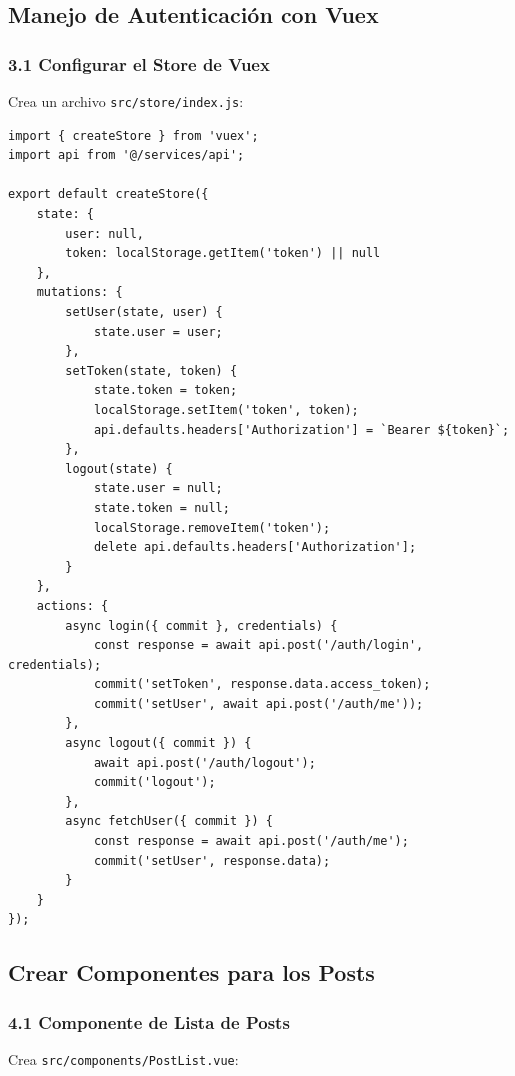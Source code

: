 \documentclass[11pt]{article}
\begin{document}
\subsection{Manejo de Autenticación con Vuex}
\label{sec:orged00ea2}

\subsubsection{3.1 Configurar el Store de Vuex}
\label{sec:org1351661}
Crea un archivo \texttt{src/store/index.js}:

\begin{verbatim}
import { createStore } from 'vuex';
import api from '@/services/api';

export default createStore({
    state: {
        user: null,
        token: localStorage.getItem('token') || null
    },
    mutations: {
        setUser(state, user) {
            state.user = user;
        },
        setToken(state, token) {
            state.token = token;
            localStorage.setItem('token', token);
            api.defaults.headers['Authorization'] = `Bearer ${token}`;
        },
        logout(state) {
            state.user = null;
            state.token = null;
            localStorage.removeItem('token');
            delete api.defaults.headers['Authorization'];
        }
    },
    actions: {
        async login({ commit }, credentials) {
            const response = await api.post('/auth/login', credentials);
            commit('setToken', response.data.access_token);
            commit('setUser', await api.post('/auth/me'));
        },
        async logout({ commit }) {
            await api.post('/auth/logout');
            commit('logout');
        },
        async fetchUser({ commit }) {
            const response = await api.post('/auth/me');
            commit('setUser', response.data);
        }
    }
});
\end{verbatim}

\subsection{Crear Componentes para los Posts}
\label{sec:org8d42f0a}

\subsubsection{4.1 Componente de Lista de Posts}
\label{sec:orgddff21f}
Crea \texttt{src/components/PostList.vue}:
\end{document}

